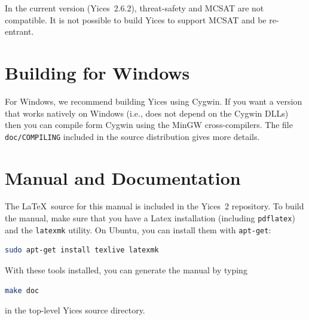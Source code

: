 \documentclass[11pt,twoside,fleqn,openright,titlepage]{cslreport}
\begin{document}
\medskip\noindent
In the current version (Yices~2.6.2), threat-safety and MCSAT are not compatible.
It is not possible to build Yices to support MCSAT and be re-entrant.


\section{Building for Windows}

For Windows, we recommend building Yices using Cygwin. If you want a
version that works natively on Windows (i.e., does not depend on the
Cygwin DLLs) then you can compile form Cygwin using the MinGW
cross-compilers.  The file \texttt{doc/COMPILING} included in the
source distribution gives more details.

\section{Manual and Documentation}

The \LaTeX\ source for this manual is included in the Yices~2
repository.  To build the manual, make sure that you have a Latex
installation (including \texttt{pdflatex}) and the \texttt{latexmk} utility.
On Ubuntu, you can install them with \texttt{apt-get}:
\begin{small}
\begin{lstlisting}[language=sh]
  sudo apt-get install texlive latexmk
\end{lstlisting}
\end{small}
With these tools installed, you can generate the manual by typing
\begin{small}
\begin{lstlisting}[language=sh]
  make doc
\end{lstlisting}
\end{small}
in the top-level Yices source directory.
\end{document}
